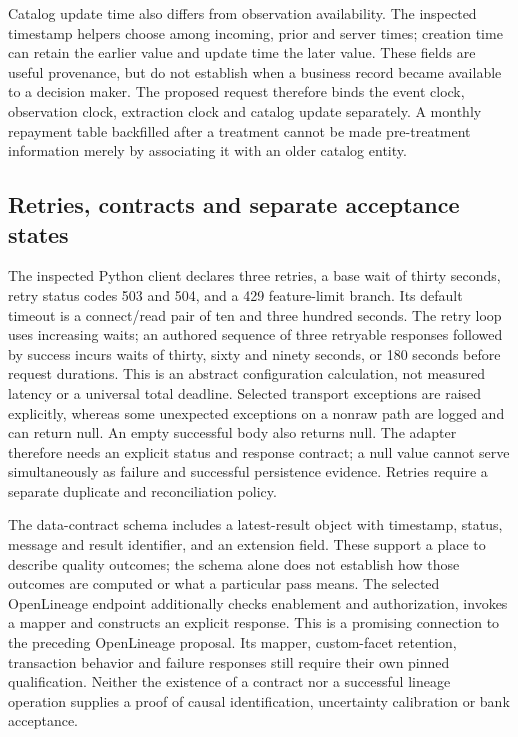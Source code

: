 Catalog update time also differs from observation availability. The inspected
timestamp helpers choose among incoming, prior and server times; creation time
can retain the earlier value and update time the later value. These fields are
useful provenance, but do not establish when a business record became available
to a decision maker. The proposed request therefore binds the event clock,
observation clock, extraction clock and catalog update separately. A monthly
repayment table backfilled after a treatment cannot be made pre-treatment
information merely by associating it with an older catalog entity.
\citep{exec24_openmetadata_source}

\subsection{Retries, contracts and separate acceptance states}

The inspected Python client declares three retries, a base wait of thirty
seconds, retry status codes 503 and 504, and a 429 feature-limit branch. Its
default timeout is a connect/read pair of ten and three hundred seconds.
The retry loop uses increasing waits; an authored sequence of three retryable
responses followed by success incurs waits of thirty, sixty and ninety seconds,
or 180 seconds before request durations. This is an abstract configuration
calculation, not measured latency or a universal total deadline. Selected
transport exceptions are raised explicitly, whereas some unexpected exceptions
on a nonraw path are logged and can return null. An empty successful body also
returns null. The adapter therefore needs an explicit status and response
contract; a null value cannot serve simultaneously as failure and successful
persistence evidence. Retries require a separate duplicate and reconciliation
policy.~\citep{exec24_openmetadata_source,exec24_openmetadata_reference}

The data-contract schema includes a latest-result object with timestamp, status,
message and result identifier, and an extension field. These support a place
to describe quality outcomes; the schema alone does not establish how those
outcomes are computed or what a particular pass means. The selected OpenLineage
endpoint additionally checks enablement and authorization, invokes a mapper and
constructs an explicit response. This is a promising connection to the preceding
OpenLineage proposal. Its mapper, custom-facet retention, transaction behavior and
failure responses still require their own pinned qualification. Neither the
existence of a contract nor a successful lineage operation supplies a proof of
causal identification, uncertainty calibration or bank acceptance.
\citep{exec24_openmetadata_source}


